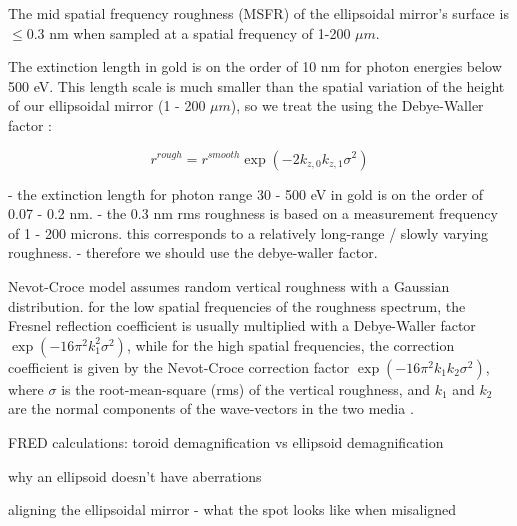 The mid spatial frequency roughness (MSFR) of the ellipsoidal mirror's surface is $\le0.3$ nm when sampled at a spatial frequency of 1-200 $\mu m$.

The extinction length in gold is on the order of 10 nm for photon energies below 500 eV. This length scale is much smaller than the spatial variation of the height of our ellipsoidal mirror (1 - 200 $\mu m$), so we treat the using the Debye-Waller factor \cite{stoevReviewGrazingIncidence1999,gibaudSpecularReflectivitySmooth2009}:

\begin{equation}
r^{rough} = r^{smooth} \exp \left( -2 k_{z,0} k_{z,1} \sigma^2 \right)
\end{equation}


- the extinction length for photon range 30 - 500 eV in gold is on the order of 0.07 - 0.2 nm.
- the 0.3 nm rms roughness is based on a measurement frequency of 1 - 200 microns. this corresponds to a relatively long-range / slowly varying roughness.
- therefore we should use the debye-waller factor.



Nevot-Croce model assumes random vertical roughness with a Gaussian distribution. for the low spatial frequencies of the roughness spectrum, the Fresnel reflection coefficient is usually multiplied with a Debye-Waller factor $\exp\left(-16 \pi^2 k_1^2 \sigma^2\right)$, while for the high spatial frequencies, the correction coefficient is given by the Nevot-Croce correction factor $\exp\left(-16 \pi^2 k_1 k_2 \sigma^2\right)$, where $\sigma$ is the root-mean-square (rms) of the vertical roughness, and $k_1$ and $k_2$ are the normal components of the wave-vectors in the two media \cite{stoevReviewGrazingIncidence1999}.



FRED calculations: toroid demagnification vs ellipsoid demagnification

why an ellipsoid doesn't have aberrations

aligning the ellipsoidal mirror - what the spot looks like when misaligned

